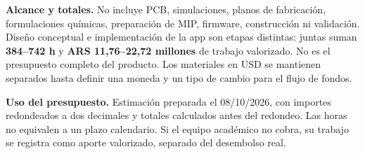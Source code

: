 \documentclass[11pt,a4paper]{article}
\begin{document}
\textbf{Alcance y totales.} No incluye PCB, simulaciones, planos de fabricación,
formulaciones químicas, preparación de MIP, firmware, construcción ni validación.
Diseño conceptual e implementación de la app son etapas distintas: juntas suman
\textbf{384--742 h} y \textbf{ARS 11,76--22,72 millones} de trabajo valorizado.
No es el presupuesto completo del producto. Los materiales en USD se mantienen
separados hasta definir una moneda y un tipo de cambio para el flujo de fondos.

\textbf{Uso del presupuesto.} Estimación preparada el 08/10/2026, con importes
redondeados a dos decimales y totales calculados antes del redondeo.
Las horas no equivalen a un plazo calendario. Si el equipo académico no cobra,
su trabajo se registra como aporte valorizado, separado del desembolso real.
\end{document}
